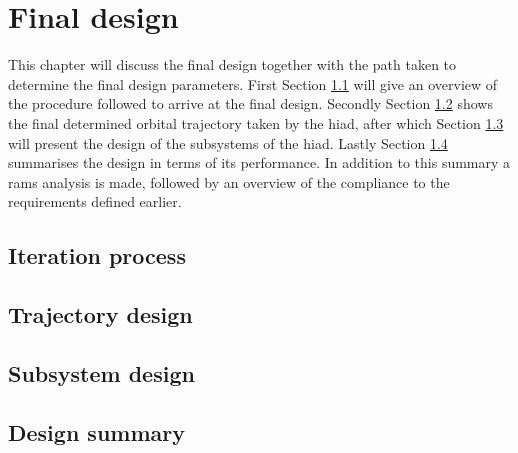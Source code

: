 \section{Final design}\label{cha:finaldesign}
This chapter will discuss the final design together with the path taken to determine the final design parameters. First Section \ref{sec:iterationprocess} will give an overview of the procedure followed to arrive at the final design. Secondly Section \ref{sec:trajectorydesign} shows the final determined orbital trajectory taken by the \gls{hiad}, after which Section \ref{sec:subsystemdesign} will present the design of the subsystems of the \gls{hiad}. Lastly Section \ref{sec:designsummary} summarises the design in terms of its performance. In addition to this summary a \gls{rams} analysis is made, followed by an overview of the compliance to the requirements defined earlier.

\subsection{Iteration process} \label{sec:iterationprocess}


\subsection{Trajectory design} \label{sec:trajectorydesign}


\subsection{Subsystem design} \label{sec:subsystemdesign}


\subsection{Design summary} \label{sec:designsummary}

